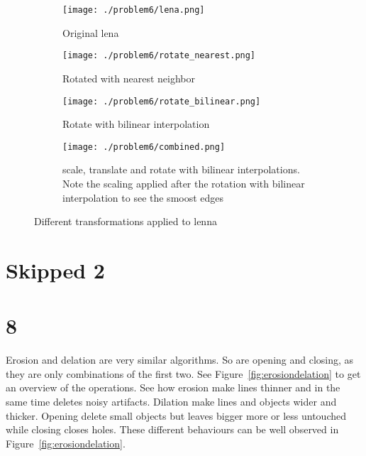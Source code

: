 \documentclass[a4paper]{scrartcl}
\begin{document}
\begin{figure}[h]
  \centering
  \begin{subfigure}[t]{0.4\textwidth}
    \texttt{[image: ./problem6/lena.png]}
    \caption{Original lena}
  \end{subfigure}
  \begin{subfigure}[t]{0.4\textwidth}
    \texttt{[image: ./problem6/rotate\_nearest.png]}
    \caption{Rotated with nearest neighbor}
  \end{subfigure}
  \begin{subfigure}[t]{0.4\textwidth}
    \texttt{[image: ./problem6/rotate\_bilinear.png]}
    \caption{Rotate with bilinear interpolation}
  \end{subfigure}
  \begin{subfigure}[t]{0.4\textwidth}
    \texttt{[image: ./problem6/combined.png]}
    \caption{scale, translate and rotate with bilinear interpolations. Note the scaling applied after the rotation with bilinear interpolation to see the smoost edges }
  \end{subfigure}
  \caption{Different transformations applied to lenna}
  \label{fig:transformations}
\end{figure}

\section{Skipped 2}

\section{8}

Erosion and delation are very similar algorithms. So are opening and closing, as they are only combinations of the first two. See Figure~\ref{fig:erosiondelation} to get an overview of the operations.
See how erosion make lines thinner and in the same time deletes noisy artifacts. Dilation make lines and objects wider and thicker. Opening delete small objects but leaves bigger more or less untouched while closing closes holes. These different behaviours can be well observed in Figure~\ref{fig:erosiondelation}.
\end{document}
